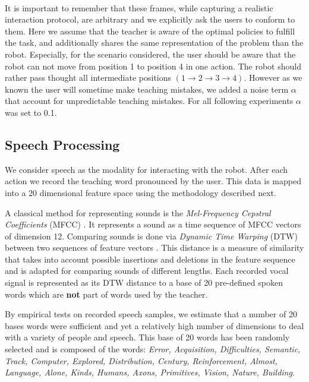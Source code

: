 \paragraph{} It is important to remember that these frames, while capturing a realistic interaction protocol, are arbitrary and we explicitly ask the users to conform to them. Here we assume that the teacher is aware of the optimal policies to fulfill the task, and additionally shares the same representation of the problem than the robot. Especially, for the scenario considered, the user should be aware that the robot can not move from position 1 to position 4 in one action. The robot should rather pass thought all intermediate positions $(1 \rightarrow 2 \rightarrow 3 \rightarrow 4)$. However as we known the user will sometime make teaching mistakes, we added a noise term $\alpha$ that account for unpredictable teaching mistakes. For all following experiments $\alpha$ was set to 0.1.

\subsection{Speech Processing}
\label{chapter:lfui:speechdata}

We consider speech as the modality for interacting with the robot. After each action we record the teaching word pronounced by the user. This data is mapped into a 20 dimensional feature space using the methodology described next.  

A classical method for representing sounds is the \textit{Mel-Frequency Cepstral Coefficients} (MFCC) \cite{zheng2001comparison}. It represents a sound as a time sequence of MFCC vectors of dimension 12. Comparing sounds is done via \textit{Dynamic Time Warping} (DTW) between two sequences of feature vectors \cite{sakoe1978dynamic}. This distance is a measure of similarity that takes into account possible insertions and deletions in the feature sequence and is adapted for comparing sounds of different lengths. Each recorded vocal signal is represented as its DTW distance to a base of 20 pre-defined spoken words which are \textbf{not} part of words used by the teacher.

By empirical tests on recorded speech samples, we estimate that a number of 20 bases words were sufficient and yet a relatively high number of dimensions to deal with a variety of people and speech. This base of 20 words has been randomly selected and is composed of the words:\emph{ \footnotesize{Error, Acquisition, Difficulties, Semantic, Track, Computer, Explored, Distribution, Century, Reinforcement, Almost, Language, Alone, Kinds, Humans, Axons, Primitives, Vision, Nature, Building}}.

